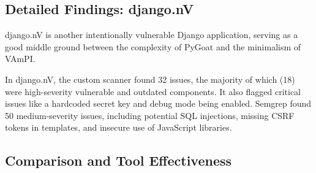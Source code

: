 \subsection{Detailed Findings: django.nV}

django.nV is another intentionally vulnerable Django application, serving as a good middle ground between the complexity of PyGoat and the minimalism of VAmPI.

\begin{table}[h!]
\centering
\caption{Vulnerabilities Identified in django.nV}
\label{tab:djangonv_vulns}
\end{table}

In django.nV, the custom scanner found 32 issues, the majority of which (18) were high-severity vulnerable and outdated components. It also flagged critical issues like a hardcoded secret key and debug mode being enabled. Semgrep found 50 medium-severity issues, including potential SQL injections, missing CSRF tokens in templates, and insecure use of JavaScript libraries.

\subsection{Comparison and Tool Effectiveness}

